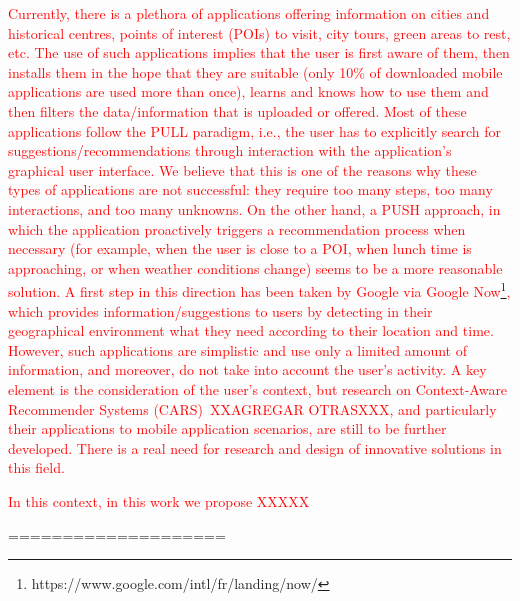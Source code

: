 
\textcolor{red}{Currently, there is a plethora of applications offering information on cities and historical centres, points of interest (POIs) to visit, city tours, green areas to rest, etc. The use of such applications implies that the user is first aware of them, then installs them in the hope that they are suitable (only 10\% of downloaded mobile applications are used more than once), learns and knows how
to use them and then filters the data/information that is uploaded or offered. Most of these
applications follow the PULL paradigm, i.e., the user has to explicitly search for
suggestions/recommendations through interaction with the application’s graphical user interface.
We believe that this is one of the reasons why these types of applications are not successful: they
require too many steps, too many interactions, and too many unknowns. On the other hand, a
PUSH approach, in which the application proactively triggers a recommendation process when
necessary (for example, when the user is close to a POI, when lunch time is approaching, or
when weather conditions change) seems to be a more reasonable solution. A first step in this
direction has been taken by Google via Google Now\footnote{https://www.google.com/intl/fr/landing/now/}, 
which provides information/suggestions
to users by detecting in their geographical environment what they need according to their
location and time. However, such applications are simplistic and use only a limited amount of
information, and moreover, do not take into account the user’s activity. A key element is the
consideration of the user’s context, but research on Context-Aware Recommender Systems
(CARS)~\cite{adomavicius2011context,nejma2015service}XXAGREGAR OTRASXXX, and particularly their applications to mobile application scenarios, are still to
be further developed. There is a real need for research and design of innovative solutions in this field.
}

\textcolor{red}{In this context, in this work we propose XXXXX}

====================

